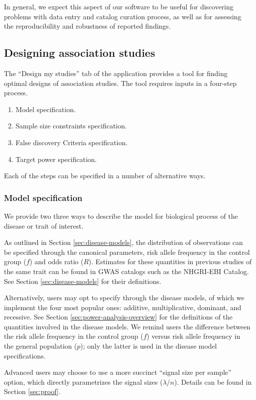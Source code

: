 In general, we expect this aspect of our software to be useful for discovering problems with data entry and catalog curation process, as well as for assessing the reproducibility and robustness of reported findings.

\subsection{Designing association studies}

The ``Design my studies'' tab of the application provides a tool for finding optimal designs of association studies.
The tool requires inputs in a four-step process.
\begin{enumerate}
    \item Model specification.
    \item Sample size constraints specification.
    \item False discovery Criteria specification.
    \item Target power specification.
\end{enumerate}
Each of the steps can be specified in a number of alternative ways.

\subsubsection{Model specification}

We provide two three ways to describe the model for biological process of the disease or trait of interest.

As outlined in Section \ref{sec:disease-models}, the distribution of observations can be specified through the canonical parameters, risk allele frequency in the control group ($f$) and odds ratio ($R$).
Estimates for these quantities in previous studies of the same trait can be found in GWAS catalogs such as the NHGRI-EBI Catalog.
See Section \ref{sec:disease-models} for their definitions.

Alternatively, users may opt to specify through the disease models, of which we implement the four most popular ones: additive, multiplicative, dominant, and recessive.
See Section \ref{sec:power-analysis-overview} for the definitions of the quantities involved in the disease models.
We remind users the difference between the risk allele frequency in the control group ($f$) versus risk allele frequency in the general population ($p$); only the latter is used in the disease model specifications.

Advanced users may choose to use a more succinct ``signal size per sample'' option, which directly parametrizes the signal sizes ($\lambda/n$).
Details can be found in Section \ref{sec:proof}.

